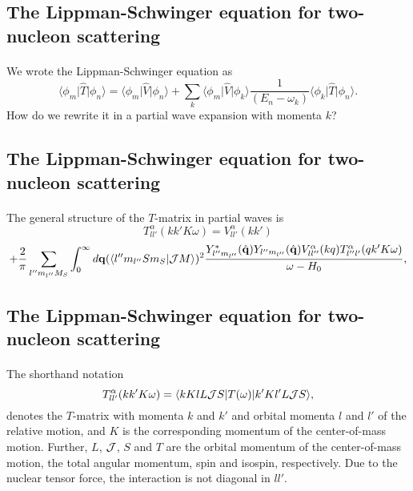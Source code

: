\documentclass[%
twoside,                 %
final,                   %
10pt]{article}
\begin{document}
\subsection*{The Lippman-Schwinger equation for two-nucleon scattering}

\paragraph{}
We wrote the Lippman-Schwinger equation as
\[
\langle \phi_m \vert\hat{T}\vert \phi_n \rangle =\langle \phi_m \vert\hat{V}\vert\phi_n \rangle+\sum_k \langle \phi_m \vert\hat{V}\vert \phi_k\rangle\frac{1}{(E_n -\omega_k)}\langle \phi_k \vert\hat{T}\vert \phi_n \rangle.
\]
How do we rewrite it in a partial wave expansion with momenta $k$?



\subsection*{The Lippman-Schwinger equation for two-nucleon scattering}

\paragraph{}
The general structure of the $T$-matrix in partial waves is
\[
   T_{ll'}^{\alpha}(kk'K\omega)=V_{ll'}^{\alpha}(kk')
\]
\begin{equation}
   +{\displaystyle \frac{2}{\pi}\sum_{l''m_{l''}M_S}\int_{0}^{\infty} d \mathbf{q}
   (\langle l''m_{l''}Sm_S|{\cal J}M\rangle)^2
   \frac{Y_{l''m_{l''}}^*(\hat{\mathbf{q}})
   Y_{l''m_{l''}}(\hat{\mathbf{q}}) V_{ll''}^{\alpha}(kq)
   T_{l''l'}^{\alpha}(qk'K\omega)}
   {\omega -H_0}},
   \label{eq:bspartial}
\end{equation}



\subsection*{The Lippman-Schwinger equation for two-nucleon scattering}

\paragraph{}
The  shorthand notation
\[
    T_{ll'}^{\alpha}(kk'K\omega)=
   \langle kKlL{\cal J}S\vert T(\omega)\vert k'Kl'L{\cal J}S\rangle,
\]
denotes the $T$-matrix
with momenta $k$ and $k'$ and orbital momenta $l$ and $l'$
of the relative motion, and
$K$ is the corresponding momentum of
the center-of-mass motion. Further, $L$, ${\cal J}$, $S$ and $T$
are the orbital momentum of the center-of-mass motion, the
total angular momentum,
spin and isospin, respectively. 
Due to the nuclear tensor force, the interaction is not diagonal in $ll'$.
\end{document}
